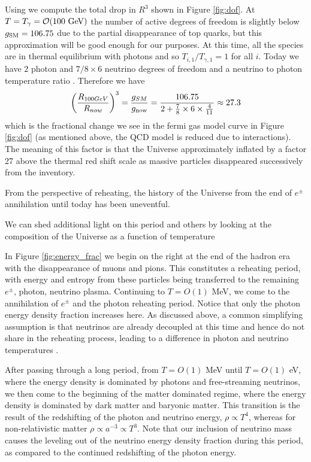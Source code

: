 {Using  we compute the total drop in $R^3$ shown in Figure \ref{fig:dof}. At $T=T_\gamma=\mathcal{O}(100\text{ GeV})$ the number of active degrees of freedom is slightly below $g_{\rm SM}=106.75$ due to the partial disappearance of top quarks, but this approximation will be good enough for our purposes. At this time, all the species are in thermal equilibrium with photons and so $T_{i,1}/T_{\gamma,1}=1$ for all $i$. Today we have $2$ photon and $7/8\times 6$ neutrino degrees of freedom and a neutrino to photon temperature ratio . Therefore we have
\begin{equation}
\left(\frac{R_{100GeV}}{R_{now}}\right)^3= \frac{g_{SM}}{g_{\rm now}}=\frac{106.75}{2+\frac{7}{8}\times 6\times \frac{4}{11}}\approx 27.3
\end{equation}
which is the fractional change we see in the fermi gas model curve in Figure \ref{fig:dof} (as mentioned above, the QCD model is reduced due to interactions). The meaning of this factor is that the Universe approximately inflated by a factor 27 above the thermal red shift scale as massive particles disappeared successively from the inventory. 

From the perspective of reheating, the history of the Universe from the end of $e^\pm$ annihilation until today has been uneventful. 

We can shed additional light on this period and others by looking at the composition of the Universe as a function of temperature


In Figure \ref{fig:energy_frac} we begin on the right at the end of the hadron era with the disappearance of muons and pions. This constitutes a reheating period, with energy and entropy from these particles being transferred to the remaining $e^\pm$, photon, neutrino plasma. Continuing to $T=O(1)$ MeV, we come to the annihilation of $e^\pm$ and the photon reheating period. Notice that only the photon energy density fraction increases here. As discussed above, a common simplifying assumption is that neutrinos are already decoupled at this time and hence do not share in the reheating process, leading to a difference in photon and neutrino temperatures .

After passing through a long period, from $T=O(1)$ MeV until $T=O(1)$ eV, where the energy density is dominated by photons and free-streaming neutrinos, we then come to the beginning of the matter dominated regime, where the energy density is dominated by dark matter and baryonic matter. This transition is the result of the redshifting of the photon and neutrino energy, $\rho\propto T^4$, whereas for non-relativistic matter $\rho\propto a^{-3}\propto T^3$. Note that our inclusion of neutrino mass causes the leveling out of the neutrino energy density fraction during this period, as compared to the continued redshifting of the photon energy.

}
